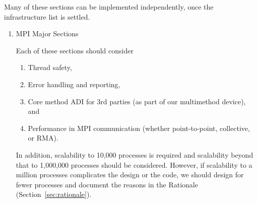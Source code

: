 \documentclass{article}
\begin{document}
Many of these sections can be implemented independently, once the
infrastructure list is settled. 
\begin{enumerate}
%

\item MPI Major Sections

  Each of these sections should consider
  \begin{enumerate}
    \item Thread safety,
    \item Error handling and reporting,
    \item Core method ADI for 3rd parties (as part of our multimethod device),
      and 
    \item Performance in MPI communication (whether point-to-point,
      collective, or RMA).
    \end{enumerate}
    In addition, scalability to 10,000 processes is required and scalability
    beyond that to 1,000,000 processes should be considered.  However, if
    scalability to a million processes complicates the design or the code, we
    should design for fewer processes and document the reasons in the
    Rationale (Section~\ref{sec:rationale}).



\end{enumerate}
\end{document}
